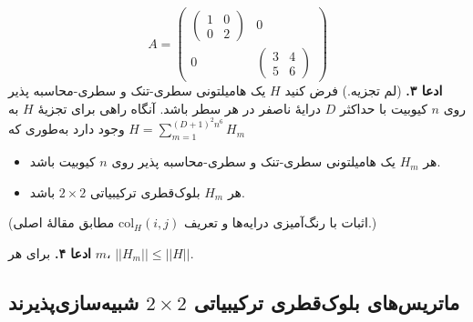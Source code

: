   \[
   A = \begin{pmatrix}
   	\begin{pmatrix}1 & 0\\0 & 2\end{pmatrix} & 0\\
   	0 & \begin{pmatrix}3 & 4\\5 & 6\end{pmatrix}
   \end{pmatrix}
   \]
\textbf{ادعا ۳.}
 (لم تجزیه.) فرض کنید $H$ یک هامیلتونی سطری-تنک و سطری-‌محاسبه پذیر روی $n$ کیوبیت با حداکثر $D$ درایهٔ ناصفر در هر سطر باشد. آنگاه راهی برای تجزیهٔ $H$ به $H = \sum_{m=1}^{(D+1)^2 n^6} H_m$ وجود دارد به‌طوری که
 \begin{itemize}
 	\item 
 	  هر $H_m$ یک هامیلتونی سطری-تنک و سطری-‌محاسبه پذیر روی $n$ کیوبیت باشد. 
 	\item
 	  هر $H_m$  بلوک‌قطری ترکیبیاتی $2 \times 2$ باشد.
 \end{itemize}
 
    (اثبات با رنگ‌آمیزی درایه‌ها و تعریف $\mathrm{col}_H(i,j)$ مطابق مقالهٔ اصلی.)

\textbf{ادعا ۴.} برای هر $m$، $||H_m|| \le ||H||$.

\subsection{ ماتریس‌های بلوک‌قطری ترکیبیاتی $2 \times 2$ شبیه‌سازی‌پذیرند}

